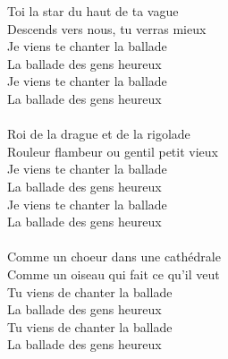 Toi la star du haut de ta vague\\
Descends vers nous, tu verras mieux\\
Je viens te chanter la ballade\\
La ballade des gens heureux\\
Je viens te chanter la ballade\\
La ballade des gens heureux\\\\
Roi de la drague et de la rigolade\\
Rouleur flambeur ou gentil petit vieux\\
Je viens te chanter la ballade\\
La ballade des gens heureux\\
Je viens te chanter la ballade\\
La ballade des gens heureux\\\\
Comme un choeur dans une cathédrale\\
Comme un oiseau qui fait ce qu'il veut\\
Tu viens de chanter la ballade\\
La ballade des gens heureux\\
Tu viens de chanter la ballade\\
La ballade des gens heureux\\
